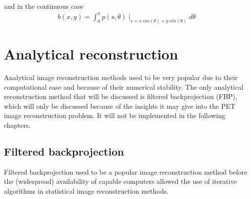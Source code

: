 \documentclass[report,12pt]{report}
\begin{document}
and in the continuous case
\begin{align}
	b(x,y) = \int_0^{\pi} p(s,\theta)\mid_{s=x\ cos(\theta)+ y\ sin(\theta)} d\theta
\end{align}




\section{Analytical reconstruction}
Analytical image reconstruction methods used to be very popular due to their computational ease and because of their numerical stability. The only analytical reconstruction method that will be discussed is filtered backprojection (FBP), which will only be discussed because of the insights it may give into the PET image reconstruction problem. It will not be implemented in the following chapters.



\subsection{Filtered backprojection}
Filtered backprojection used to be a popular image reconstruction method before the (widespread) availability of capable computers allowed the use of iterative algorithms in statistical image reconstruction methods.
\end{document}
